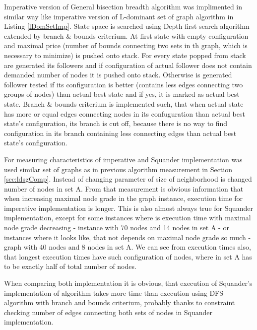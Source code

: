 \documentclass[11pt,twoside,a4paper]{book}
\begin{document}
Imperative version of General bisection breadth algorithm was implimented in
similar way like imperative version of L-dominant set of graph algorithm in
Listing \ref{lDomSetImp}. State space is searched using Depth first search
algorithm extended by branch \& bounds criterium. At first state with empty configuration
and maximal price (number of bounds connecting two sets in th graph, which is
necessary to minimize) is pushed onto stack. For every state popped from stack
are generated its followers and if configuration of actual follower does not
contain demanded number of nodes it is pushed onto stack. Otherwise is generated
follower tested if its configuration is better (contains less edges connecting
two groups of nodes) than actual best state and if yes, it is marked as actual
best state. Branch \& bounds criterium is implemented such, that when actual
state has more or equal edges connecting nodes in its confuguration than
actual best state's configuration, its branch is cut off, because there is no
way to find configuration in its branch containing less connecting edges than
actual best state's configuration.


\newpage
For measuring characteristics of imperative and Squander implementation was used
similar set of graphs as in previous algorithm measurement in
Section \ref{sec:ldsgComp}. Instead of changing parameter of size
of neighborhood is changed number of nodes in set A. From that measurement is
obvious information that when increasing maximal node grade in the graph
instance, execution time for imperative implementation is longer. This is also
almost always true for Squander implementation, except for some instances where
is execution time with maximal node grade decreasing - instance with 70 nodes
and 14 nodes in set A - or instances where it looks like, that not depends on
maximal node grade so much - graph with 40 nodes and 8 nodes in set A. We can
see from execution times also, that longest execution times have
such configuration of nodes, where in set A has to be exactly half of total
number of nodes.


When comparing both implementation it is obvious, that execution of Squander's
implementation of algorithm takes more time than execution using DFS algorithm
with branch and bounds criterium, probably thanks to constraint checking number
of edges connecting both sets of nodes in Squander implementation.
\end{document}
